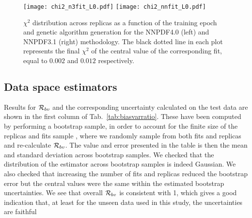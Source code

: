 \begin{figure}[h]
    \centering
    \texttt{[image: chi2\_n3fit\_L0.pdf]}
    \texttt{[image: chi2\_nnfit\_L0.pdf]}
    \caption{$\chi^2$ distribution across replicas as a function of the training
    epoch and genetic algorithm generation for the NNPDF4.0 (left) and NNPDF3.1
    (right) methodology. The black dotted line
    in each plot represents the final $\chi^2$ of the central value of the
    corresponding fit, equal to $0.002$ and $0.012$ respectively.}
    \label{fig:chi2_vs_epoch}    
\end{figure}



\subsection{Data space estimators}

Results for $\mathcal{R}_{bv}$ and the corresponding uncertainty calculated on the
test data are shown in the first column of Tab.~\ref{tab:biasvarratio}. These
have been computed by performing a bootstrap sample, 
in order to account for the finite size of the replicas and fits sample
\cite{efron1994introduction}, where we randomly sample from both fits and
replicas and re-calculate $\mathcal{R}_{bv}$. The value and error presented in the
table is then the mean and standard deviation across bootstrap samples. We
checked that the distribution of the estimator across bootstrap samples is
indeed Gaussian. We also checked that increasing the number of fits and replicas
reduced the bootstrap error but the central values were the same within the
estimated bootstrap uncertainties. We see that overall $\mathcal{R}_{bv}$  is
consistent with 1, which gives a good indication that, at least for the unseen
data used in this study, the uncertainties are faithful

